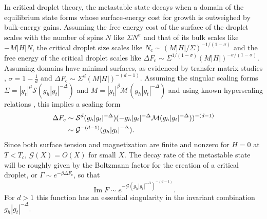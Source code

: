 \documentclass[aps,prl,reprint]{revtex4-1}
\def\[{\begin{equation}}
\def\]{\end{equation}}
\def\im{\mathop{\mathrm{Im}}\nolimits}
\def\O{O}
\def\c{\mathrm c}
\begin{document}
In critical droplet theory, the metastable state decays when a domain of the
equilibrium state forms whose surface-energy cost for growth is outweighed by
bulk-energy gains. Assuming the free energy cost of the surface of the droplet
scales with the number of spins $N$ like $\Sigma N^\sigma$ and that of its
bulk scales like $-M|H|N$, the critical droplet size scales like
$N_\c\sim(M|H|/\Sigma)^{-1/(1-\sigma)}$ and the free energy of the critical
droplet scales like $\Delta
F_\c\sim\Sigma^{1/(1-\sigma)}(M|H|)^{-\sigma/(1-\sigma)}$.  Assuming domains
have minimal surfaces, as evidenced by transfer matrix studies
\cite{gunther.1993.transfer-matrix}, $\sigma=1-\frac1d$ and $\Delta
F_\c\sim\Sigma^d(M|H|)^{-(d-1)}$. Assuming the singular scaling forms
$\Sigma=|g_t|^\mu\mathcal S(g_h|g_t|^{-\Delta})$ and $M=|g_t|^\beta\mathcal
M(g_h|g_t|^{-\Delta})$ and using known hyperscaling relations
\cite{widom.1981.interface}, this implies a scaling form
\begin{align}
  \Delta F_c&
  \sim\mathcal S^d(g_h|g_t|^{-\Delta})(-g_h|g_t|^{-\Delta}\mathcal
    M(g_h|g_t|^{-\Delta}))^{-(d-1)}\notag\\
  &\sim\mathcal G^{-(d-1)}(g_h|g_t|^{-\Delta}).
\end{align}
Since both surface tension and magnetization are finite and nonzero for $H=0$
at $T<T_c$, $\mathcal G(X)=\O(X)$ for small $X$.  The decay rate of the
metastable state will be roughly given by the Boltzmann factor for the
creation of a critical droplet, or $\Gamma\sim e^{-\beta\Delta F_c}$, so that
\[
  \im F\sim e^{-\mathcal G(g_h|g_t|^{-\Delta})^{-(d-1)}}.
\]
For $d>1$ this function has an essential singularity in the invariant
combination $g_h|g_t|^{-\Delta}$.
\end{document}
